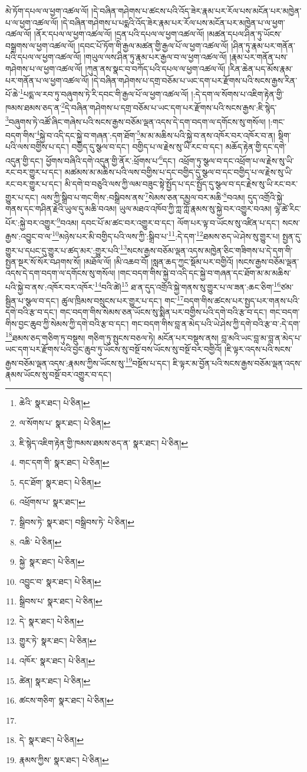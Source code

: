 མེ་ཏོག་དཔལ་ལ་ཕྱག་འཚལ་ལོ། །དེ་བཞིན་གཤེགས་པ་ཚངས་པའི་འོད་ཟེར་རྣམ་པར་རོལ་པས་མངོན་པར་མཁྱེན་པ་ལ་ཕྱག་འཚལ་ལོ། །དེ་བཞིན་གཤེགས་པ་པདྨའི་འོད་ཟེར་རྣམ་པར་རོལ་པས་མངོན་པར་མཁྱེན་པ་ལ་ཕྱག་འཚལ་ལོ། །ནོར་དཔལ་ལ་ཕྱག་འཚལ་ལོ། །དྲན་པའི་དཔལ་ལ་ཕྱག་འཚལ་ལོ། །མཚན་དཔལ་ཤིན་ཏུ་ཡོངས་བསྒྲགས་ལ་ཕྱག་འཚལ་ལོ། །དབང་པོ་ཏོག་གི་རྒྱལ་མཚན་གྱི་རྒྱལ་པོ་ལ་ཕྱག་འཚལ་ལོ། །ཤིན་ཏུ་རྣམ་པར་གནོན་པའི་དཔལ་ལ་ཕྱག་འཚལ་ལོ། །གཡུལ་ལས་ཤིན་ཏུ་རྣམ་པར་རྒྱལ་བ་ལ་ཕྱག་འཚལ་ལོ། །རྣམ་པར་གནོན་པས་གཤེགས་པ་ལ་ཕྱག་འཚལ་ལོ། །ཀུན་ནས་སྣང་བ་བཀོད་པའི་དཔལ་ལ་ཕྱག་འཚལ་ལོ། །རིན་ཆེན་པད་མོས་རྣམ་པར་གནོན་པ་ལ་ཕྱག་འཚལ་ལོ། །དེ་བཞིན་གཤེགས་པ་དགྲ་བཅོམ་པ་ཡང་དག་པར་རྫོགས་པའི་སངས་རྒྱས་རིན་པོ་ཆེ་\footnote{ཆེའི་  སྣར་ཐང་།  པེ་ཅིན། }པདྨ་ལ་རབ་ཏུ་བཞུགས་ཏེ་རི་དབང་གི་རྒྱལ་པོ་ལ་ཕྱག་འཚལ་ལོ། །:དེ་དག་ལ་སོགས་པ་འཇིག་རྟེན་གྱི་ཁམས་ཐམས་ཅད་ན་\footnote{ལ་སོགས་པ་  སྣར་ཐང་།  པེ་ཅིན། }དེ་བཞིན་གཤེགས་པ་དགྲ་བཅོམ་པ་ཡང་དག་པར་རྫོགས་པའི་སངས་རྒྱས་:ཇི་སྙེད་\footnote{ཇི་སྙེད་འཇིག་རྟེན་གྱི་ཁམས་ཐམས་ཅད་ན་  སྣར་ཐང་།  པེ་ཅིན། }བཞུགས་ཏེ་འཚོ་ཞིང་གཞེས་པའི་སངས་རྒྱས་བཅོམ་ལྡན་འདས་དེ་དག་བདག་ལ་དགོངས་སུ་གསོལ། །:གང་བདག་གིས་\footnote{གང་དག་གི་  སྣར་ཐང་།  པེ་ཅིན། }སྐྱེ་བ་འདི་དང་སྐྱེ་བ་གཞན་:དག་ཐོག་\footnote{དང་ཐོག་  སྣར་ཐང་།  པེ་ཅིན། }མ་མ་མཆིས་པའི་སྐྱེ་བ་ནས་འཁོར་བར་འཁོར་བ་ན། སྡིག་པའི་ལས་བགྱིས་པ་དང་། བགྱིད་དུ་སྩལ་བ་དང་། བགྱིད་པ་ལ་རྗེས་སུ་ཡི་རང་བ་དང་། མཆོད་རྟེན་གྱི་དང་དགེ་འདུན་གྱི་དང་། ཕྱོགས་བཞིའི་དགེ་འདུན་གྱི་ནོར་:ཕྲོགས་པ་\footnote{འཕྲོགས་པ་  སྣར་ཐང་། }དང་། འཕྲོག་ཏུ་སྩལ་བ་དང་འཕྲོག་པ་ལ་རྗེས་སུ་ཡི་རང་བར་གྱུར་པ་དང་། མཚམས་མ་མཆིས་པའི་ལས་བགྱིས་པ་དང་བགྱིད་དུ་སྩལ་བ་དང་བགྱིད་པ་ལ་རྗེས་སུ་ཡི་རང་བར་གྱུར་པ་དང་། མི་དགེ་བ་བཅུའི་ལས་ཀྱི་ལམ་བཟུང་སྟེ་སྤྱོད་པ་དང་སྤྱོད་དུ་སྩལ་བ་དང་རྗེས་སུ་ཡི་རང་བར་གྱུར་པ་དང་། ལས་ཀྱི་སྒྲིབ་པ་གང་གིས་:བསྒྲིབས་ནས་\footnote{སྒྲིབས་ཏེ་  སྣར་ཐང་། བསྒྲིབས་ཏེ་  པེ་ཅིན། }སེམས་ཅན་དམྱལ་བར་མཆི་\footnote{འཆི་  པེ་ཅིན། }བའམ། དུད་འགྲོའི་སྐྱེ་གནས་དང་གཤིན་རྗེའི་ཡུལ་དུ་མཆི་བའམ། ཡུལ་མཐའ་འཁོབ་ཀྱི་ཀླ་ཀློ་རྣམས་སུ་སྐྱེ་བར་འགྱུར་བའམ། ལྷ་ཚེ་རིང་པོར་:སྐྱེ་བར་འགྱུར་\footnote{སྐྱེ་  སྣར་ཐང་།  པེ་ཅིན། }བའམ། དབང་པོ་མ་ཚང་བར་འགྱུར་བ་དང་། ལོག་པར་ལྟ་བ་ཡོངས་སུ་འཛིན་པ་དང་། སངས་རྒྱས་:འབྱུང་བ་ལ་\footnote{འབྱུང་བ་  སྣར་ཐང་།  པེ་ཅིན། }མཉེས་པར་མི་བགྱིད་པའི་ལས་ཀྱི་:སྒྲིབ་པ་\footnote{སྒྲིབས་པ་  སྣར་ཐང་།  པེ་ཅིན། }:དེ་དག་\footnote{དེ་  སྣར་ཐང་།  པེ་ཅིན། }ཐམས་ཅད་ཡེ་ཤེས་སུ་གྱུར་པ། སྤྱན་དུ་གྱུར་པ་དཔང་དུ་གྱུར་པ་ཚད་མར་:གྱུར་པའི་\footnote{གྱུར་ཏེ་  སྣར་ཐང་།  པེ་ཅིན། }སངས་རྒྱས་བཅོམ་ལྡན་འདས་མཁྱེན་ཅིང་གཟིགས་པ་དེ་དག་གི་སྤྱན་སྔར་སོ་སོར་བཤགས་སོ། །མཐོལ་ལོ། །མི་འཆབ་བོ། །སླན་ཆད་ཀྱང་སྡོམ་པར་བགྱིའོ། །སངས་རྒྱས་བཅོམ་ལྡན་འདས་དེ་དག་བདག་ལ་དགོངས་སུ་གསོལ། །གང་བདག་གིས་སྐྱེ་བ་འདི་དང་སྐྱེ་བ་གཞན་དང་ཐོག་མ་མ་མཆིས་པའི་སྐྱེ་བ་ནས་:འཁོར་བར་འཁོར་\footnote{འཁོར་  སྣར་ཐང་།  པེ་ཅིན། }བའི་ཚེ།\footnote{ཚེན།  སྣར་ཐང་།  པེ་ཅིན། } ཐ་ན་དུད་འགྲོའི་སྐྱེ་གནས་སུ་གྱུར་པ་ལ་ཟན་:ཆང་ཅིག་\footnote{ཚངས་གཅིག་  སྣར་ཐང་།  པེ་ཅིན། }ཙམ་སྦྱིན་པ་སྩལ་བ་དང་། ཚུལ་ཁྲིམས་བསྲུངས་པར་གྱུར་པ་དང་། གང་\footnote{}བདག་གིས་ཚངས་པར་སྤྱད་པར་གནས་པའི་དགེ་བའི་རྩ་བ་དང་། གང་བདག་གིས་སེམས་ཅན་ཡོངས་སུ་སྨིན་པར་བགྱིས་པའི་དགེ་བའི་རྩ་བ་དང་། གང་བདག་གིས་བྱང་ཆུབ་ཀྱི་སེམས་ཀྱི་དགེ་བའི་རྩ་བ་དང་། གང་བདག་གིས་བླ་ན་མེད་པའི་ཡེ་ཤེས་ཀྱི་དགེ་བའི་རྩ་བ་:དེ་དག་\footnote{དེ་  སྣར་ཐང་།  པེ་ཅིན། }ཐམས་ཅད་གཅིག་ཏུ་བསྡུས། གཅིག་ཏུ་སྤུངས་བཅལ་ཏེ། མངོན་པར་བསྡུས་ནས། བླ་མའི་ཡང་བླ་མ་བླ་ན་མེད་པ་ཡང་དག་པར་རྫོགས་པའི་བྱང་ཆུབ་ཏུ་ཡོངས་སུ་བསྔོ་བས་ཡོངས་སུ་བསྔོ་བར་བགྱིའོ། །ཇི་ལྟར་འདས་པའི་སངས་རྒྱས་བཅོམ་ལྡན་འདས་:རྣམས་ཀྱིས་ཡོངས་སུ་\footnote{རྣམས་ཀྱིས་  སྣར་ཐང་།  པེ་ཅིན། }བསྔོས་པ་དང་། ཇི་ལྟར་མ་བྱོན་པའི་སངས་རྒྱས་བཅོམ་ལྡན་འདས་རྣམས་ཡོངས་སུ་བསྔོ་བར་འགྱུར་བ་དང་། 